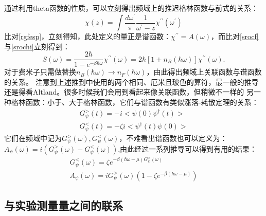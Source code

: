 \documentclass[10pt,openany]{book}
\theoremstyle{thmstyle} %
\theoremstyle{defstyle} %
\theoremstyle{prostyle} %
\begin{document}
通过利用theta函数的性质，可以立刻得出频域上的推迟格林函数与前式的关系：
\begin{equation}
  \chi(z)=\int \frac{d \omega^{\prime}}{\pi} \frac{1}{\omega^{\prime}-z} \chi^{\prime \prime}\left(\omega^{\prime}\right)
\end{equation}
比对\eqref{rgfesp}，立刻得知，此处定义的量正是谱函数：$ \chi^{\prime \prime}=A(\omega) $，而比对\eqref{srocf}与\eqref{srochi}立刻得到：
\begin{equation}
  S(\omega)=\frac{2 \hbar}{1-e^{-\beta \hbar \omega}} \chi^{\prime \prime}(\omega)=2 \hbar\left[1+n_B(\hbar \omega)\right] \chi^{\prime \prime}(\omega) .
  \label{cfandsf}
\end{equation} 
对于费米子只需做替换$ n_B(\hbar \omega)\to n_F(\hbar \omega) $，由此得出频域上关联函数与谱函数的关系。
注意到上述推到中使用的两个相同、厄米且玻色的算符，最一般的推导还是得看Altland。很多时候我们会用到看起来像关联函数，但稍微不一样的
另一种格林函数：小于、大于格林函数，它们与谱函数有类似涨落-耗散定理的关系：
\begin{equation}
	\begin{aligned}
		G^>_{\psi}(t)=-i<\psi(0)\psi^\dagger(t)>\\
		G^<_{\psi}(t)=-\zeta i<\psi^\dagger(t)\psi(0)>
	\end{aligned}
\end{equation}
它们在频域中记为$ G^>_{\psi}(\omega),G^<_{\psi}(\omega) $，不难看出谱函数也可以定义为：$ A_\psi(\omega)=i(G^>_{\psi}(\omega)-G^<_{\psi}(\omega)) $,由此经过一系列推导可以得到有用的结果：
\begin{equation}
	\begin{aligned}
		G^<_{\psi}(\omega)=\zeta e^{-\beta(\hbar\omega-\mu)G^>_{\psi}(\omega)}\\
		A_\psi(\omega)=iG^>_{\psi}(\omega)(1-\zeta e^{-\beta(\hbar\omega-\mu)})
	\end{aligned}
	\label{landgsf}
\end{equation} 
\subsection{与实验测量量之间的联系}
\end{document}
